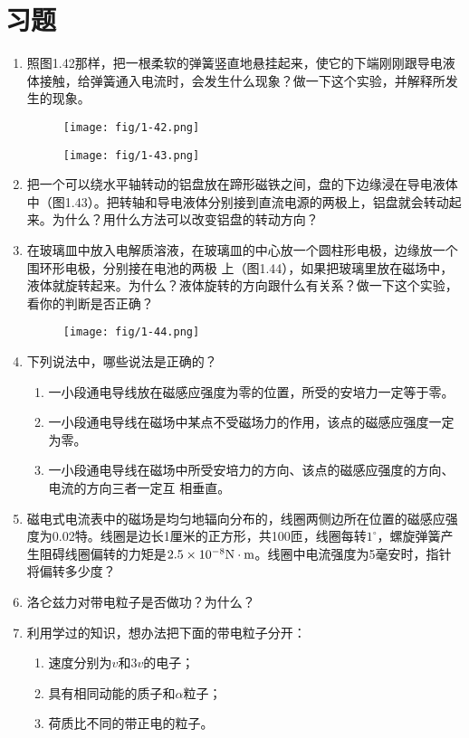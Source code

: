 \section*{习题}
\begin{enumerate}
    \item 照图1.42那样，把一根柔软的弹簧竖直地悬挂起来，使它的下端刚刚跟导电液体接触，给弹簧通入电流时，会发生什么现象？做一下这个实验，并解释所发生的现象。

\begin{figure}[htp]
\centering
\begin{minipage}[t]{0.48\textwidth}
\centering
    	\texttt{[image: fig/1-42.png]}
\caption{}
\end{minipage}
\begin{minipage}[t]{0.48\textwidth}
\centering
	\texttt{[image: fig/1-43.png]}
\caption{}
\end{minipage}
\end{figure}

    \item 把一个可以绕水平轴转动的铝盘放在蹄形磁铁之间，盘的下边缘浸在导电液体中（图1.43）。把转轴和导电液体分别接到直流电源的两极上，铝盘就会转动起来。为什么？用什么方法可以改变铝盘的转动方向？
\item 在玻璃皿中放入电解质溶液，在玻璃皿的中心放一个圆柱形电极，边缘放一个围环形电极，分别接在电池的两极
上（图1.44），如果把玻璃里放在磁场中，液体就旋转起来。为什么？液体旋转的方向跟什么有关系？做一下这个实验，看你的判断是否正确？
\begin{figure}[htp]\centering
	\texttt{[image: fig/1-44.png]}
	\caption{ }
\end{figure}
\item 下列说法中，哪些说法是正确的？
\begin{enumerate}
    \item 一小段通电导线放在磁感应强度为零的位置，所受的安培力一定等于零。
    \item 一小段通电导线在磁场中某点不受磁场力的作用，该点的磁感应强度一定为零。
    \item 一小段通电导线在磁场中所受安培力的方向、该点的磁感应强度的方向、电流的方向三者一定互
相垂直。
\end{enumerate}

\item 磁电式电流表中的磁场是均匀地辐向分布的，线圈两侧边所在位置的磁感应强度为0.02特。线圈是边长1厘米的正方形，共100匝，线圈每转$1^{\circ}$，螺旋弹簧产生阻碍线圈偏转的力矩是$2.5\times10^{-8}{\rm N}\cdot {\rm m}$。线圈中电流强度为5毫安时，指针将偏转多少度？
\item 洛仑兹力对带电粒子是否做功？为什么？    
\item 利用学过的知识，想办法把下面的带电粒子分开：
\begin{enumerate}
    \item 速度分别为$v$和$3v$的电子；
    \item 具有相同动能的质子和$\alpha$粒子；
    \item 荷质比不同的带正电的粒子。
\end{enumerate}


\end{enumerate}
